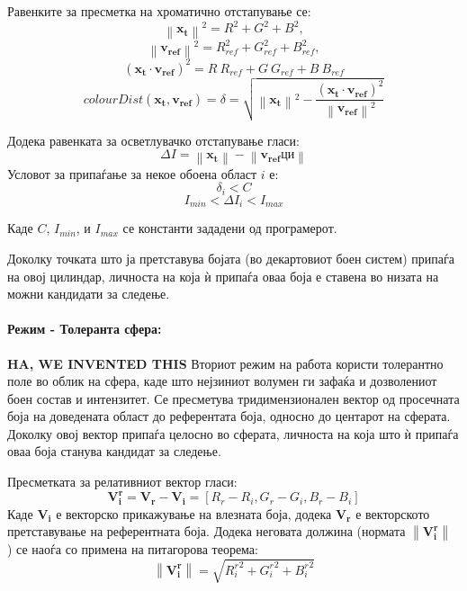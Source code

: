 \documentclass[12pt]{article}
\newcommand\norm[1]{\left\lVert#1\right\rVert}
\renewcommand{\vec}[1]{\mathbf{#1}}
\begin{document}
        Равенките за пресметка на хроматично отстапување се:
        $$  \norm{\vec{x_t}}^2 = R^2 + G^2 + B^2,$$
        $$  \norm{\vec{v_{ref}}}^2 = R_{ref}^2 + G_{ref}^2 + B_{ref}^2, $$
        $$    (\vec{x_t} \cdot \vec{v_{ref}})^2 = R\ R_{ref} + G\ G_{ref} + B\ B_{ref} $$
        $$    colourDist(\vec{x_t}, \vec{v_{ref}}) = \delta = \sqrt{\norm{\vec{x_t}}^2 - \frac{(\vec{x_t} \cdot \vec{v_{ref}})^2}{\norm{\vec{v_{ref}}}^2}} $$
        \bigbreak

        Додека равенката за осветлувачко отстапување гласи:
        $$ \Delta I = \norm{\vec{x_t}} - \norm{\vec{v_{ref}} ци} $$
        \bigbreak
        Условот за припаѓање за некое обоена област $i$ е:
        $$ \delta_{i} < C $$
        $$ I_{min}< \Delta I_i < I_{max} $$

        Каде $C$, $I_{min}$, и $I_{max}$ се константи зададени од програмерот.

        Доколку точката што ја претставува бојата (во декартовиот боен систем) припаѓа на овој цилиндар, личноста на која ѝ припаѓа оваа боја е ставена во низата на можни кандидати за следење.

      \paragraph{Режим - Толеранта сфера:\\}
        \textbf{HA, WE INVENTED THIS}
        Вториот режим на работа користи толерантно поле во облик на сфера, каде што нејзиниот волумен ги зафаќа и дозволениот боен состав и интензитет. Се пресметува тридимензионален вектор од просечната боја на доведената област до референтата боја, односно до центарот на сферата. Доколку овој вектор припаѓа целосно во сферата, личноста на која што ѝ припаѓа оваа боја станува кандидат за следење.

        Пресметката за релативниот вектор гласи:
        $$ \vec{V_i^r} = \vec{V_r} - \vec{V_i}= [R_r - R_i, G_r - G_i, B_r - B_i] $$
        Каде $\vec{V_i}$ е векторско прикажување на влезната боја, додека $\vec{V_r}$ е векторското претставување на референтната боја.
        Додека неговата должина (нормата $\norm{\vec{V_i^r}}$ ) се наоѓа со примена на питагорова теорема:
        $$ \norm{\vec{V_i^r}} = \sqrt{{R_i^r}^2 + {G_i^r}^2 + {B_i^r}^2} $$
\end{document}
